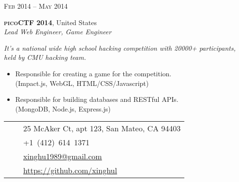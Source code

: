 \documentclass[10pt]{article}
\def\phone{{\FA \faPhone}}
\def\envelope{{\FA \faEnvelope}}
\def\home{{\FA \faHome}}
\def\github{{\FA \faGithub}}
\begin{document}
{\begin{minipage}[t]{0.5\textwidth}

{\raggedleft\textsc{Feb 2014 -- May 2014}\par}

{\raggedright\large \textbf{\textsc{picoCTF 2014}}, United States\\
\textit{Lead Web Engineer, Game Engineer}\\[5pt]}

\textit{It’s a national wide high school hacking competition with 20000+ participants, held by CMU hacking team.}
\begin{itemize}
	\item Responsible for creating a game for the competition. \\
	{\color{Mahogany}(Impact.js, WebGL, HTML/CSS/Javascript)}
	\item Responsible for building databases and RESTful APIs. \\
	{\color{Mahogany}(MongoDB, Node.js, Express.js)}
\end{itemize}


\end{minipage} %
\hfill
\begin{minipage}[t]{0.44\textwidth} %
\vspace{0pt} %


\colorbox{shade}{\ttfamily\textcolor{text1}{
\begin{tabular}{@{} m{1cm} r m{4.8cm}}
& \home & 25 McAker Ct, apt 123, San Mateo, CA 94403 \\ %
& \phone & +1~(412)~614~1371 \\ %
& \envelope & \href{mailto:xinghu1989@gmail.com}{xinghu1989@gmail.com} \\ %
& \github & \href{https://github.com/xinghul}{https://github.com/xinghul} \\ %
\end{tabular}
}
}\\[1pt]


\end{minipage}}
\end{document}
